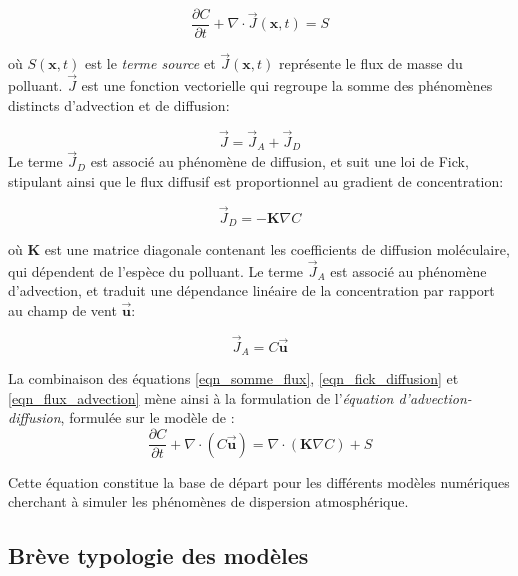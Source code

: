 	\begin{equation}
	\label{eqn_conservation_masse}
		\dfrac{\partial C}{\partial t} + \nabla \cdot \vec{J}(\bm{x},t) = S
	\end{equation}
	
	où $S(\bm{x},t)$ est le \textit{terme source} et $\vec{J}(\bm{x},t)$ représente le flux de masse du polluant. $\vec{J}$ est une fonction vectorielle qui regroupe la somme des phénomènes distincts d'advection et de diffusion: 
	
	\begin{equation}
	\label{eqn_somme_flux}
	\vec{J} = \vec{J}_A + \vec{J}_D
	\end{equation}
	Le terme $\vec{J}_D$ est associé au phénomène de diffusion, et suit une loi de Fick, stipulant ainsi que le flux diffusif est proportionnel au gradient de concentration:
	
	\begin{equation}
	\label{eqn_fick_diffusion}
	\vec{J}_D = - \bm{K}\nabla C
	\end{equation}
	
	où $\bm{K}$ est une matrice diagonale contenant les coefficients de diffusion moléculaire, qui dépendent de l'espèce du polluant. Le terme $\vec{J}_A$ est associé au phénomène d'advection, et traduit une dépendance linéaire de la concentration par rapport au champ de vent $\bm{\vec{u}}$:
	
	\begin{equation}
	\label{eqn_flux_advection}
	\vec{J}_A = C\bm{\vec{u}}
	\end{equation}
	
	La combinaison des équations \eqref{eqn_somme_flux}, \eqref{eqn_fick_diffusion} et \eqref{eqn_flux_advection} mène ainsi à la formulation de l'\textit{équation d'advection-diffusion}, formulée sur le modèle de \cite{Stockie2011}:\\
	
	\begin{equation}
		\label{eqn_advection_diffusion}
		\dfrac{\partial C}{\partial t} + \nabla \cdot(C\bm{\vec{u}}) = \nabla \cdot (\bm{K}\nabla C) + S
	\end{equation}
	
	Cette équation constitue la base de départ pour les différents modèles numériques cherchant à simuler les phénomènes de dispersion atmosphérique.\\
	
	\subsection{Brève typologie des modèles}
	
